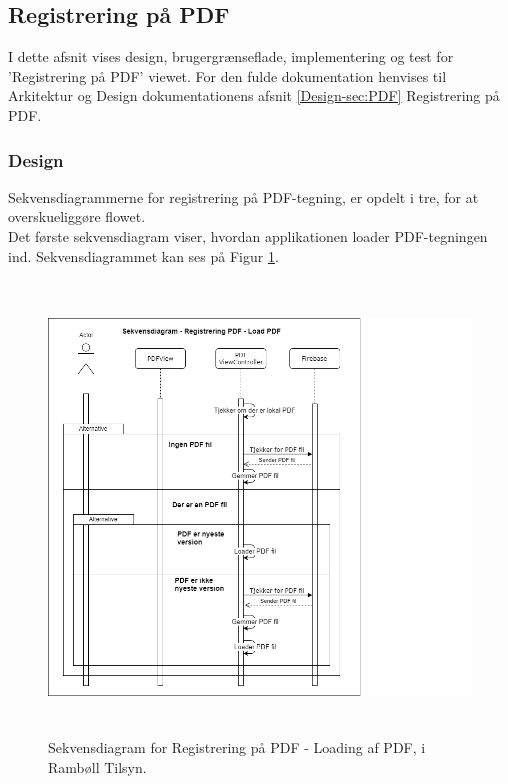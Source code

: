 \subsection{Registrering på PDF}
I dette afsnit vises design, brugergrænseflade, implementering og test for 'Registrering på PDF' viewet. For den fulde dokumentation henvises til Arkitektur og Design dokumentationens afsnit \ref{Design-sec:PDF} Registrering på PDF.
\subsubsection{Design}
Sekvensdiagrammerne for registrering på PDF-tegning, er opdelt i tre, for at overskueliggøre flowet. \\
Det første sekvensdiagram viser, hvordan applikationen loader PDF-tegningen ind. Sekvensdiagrammet kan ses på Figur \ref{fig:LoadPDFSekvensDiagram}.
\begin{figure}[H] %
	\centering
	\includegraphics[height=12cm, width=15cm]{Design/Applikation/RegistrePDF/LoadPDFSekvensDiagram}
	\caption{Sekvensdiagram for Registrering på PDF - Loading af PDF, i Rambøll Tilsyn.}
	\label{fig:LoadPDFSekvensDiagram}
\end{figure}

\clearpage


